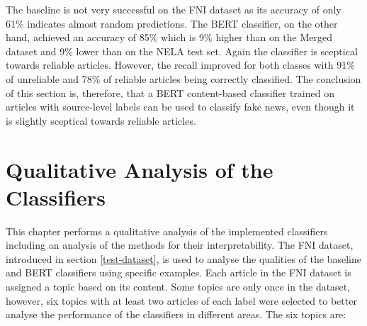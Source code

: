 The baseline is not very successful on the FNI dataset as its accuracy of only 61\% indicates almost random predictions. The BERT classifier, on the other hand, achieved an accuracy of 85\% which is 9\% higher than on the Merged dataset and 9\% lower than on the NELA test set. Again the classifier is sceptical towards reliable articles. However, the recall improved for both classes with 91\% of unreliable and 78\% of reliable articles being correctly classified. The conclusion of this section is, therefore, that a BERT content-based classifier trained on articles with source-level labels can be used to classify fake news, even though it is slightly sceptical towards reliable articles.



\chapter{Qualitative Analysis of the Classifiers}
\label{chap:inter_anal}
This chapter performs a qualitative analysis of the implemented classifiers including an analysis of the methods for their interpretability. The FNI dataset, introduced in section \ref{test-dataset}, is used to analyse the qualities of the baseline and BERT classifiers using specific examples. 
Each article in the FNI dataset is assigned a topic based on its content. Some topics are only once in the dataset, however, six topics with at least two articles of each label were selected to better analyse the performance of the classifiers in different areas. The six topics are:

